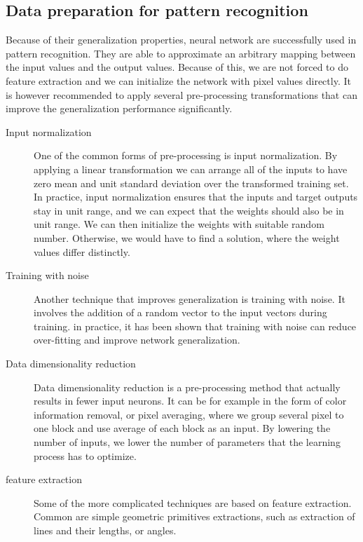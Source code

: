 \subsection{Data preparation for pattern recognition}
\cite{bishop} Because of their generalization properties, neural network are successfully used in pattern recognition. They are able to approximate an arbitrary mapping between the input values and the output values. Because of this, we are not forced to do feature extraction and we can initialize the network with pixel values directly. 
It is however recommended to apply several pre-processing transformations that can improve the generalization performance significantly.
\begin{description}
\item [Input normalization]
One of the common forms of pre-processing is input normalization. By applying a linear transformation we can arrange all of the inputs to have zero mean and unit standard deviation over the transformed training set.
In practice, input normalization ensures that the inputs and target outputs stay in unit range, and we can expect that the weights should also be in unit range. We can then initialize the weights with suitable random number. Otherwise, we would have to find a solution, where the weight values differ distinctly.
\item [Training with noise]
Another technique that improves generalization is training with noise. It involves the addition of a random vector to the input vectors during training. in practice, it has been shown that training with noise can reduce over-fitting and improve network generalization.
\item [Data dimensionality reduction]
Data dimensionality reduction is a pre-processing method that actually results in fewer input neurons. It can be for example in the form of color information removal, or pixel averaging, where we group several pixel to one block and use average of each block as an input. By lowering the number of inputs, we lower the number of parameters that the learning process has to optimize.
\item [feature extraction]
Some of the more complicated techniques are based on feature extraction. Common are simple geometric primitives extractions, such as extraction of lines and their lengths, or angles. 
\end{description}

